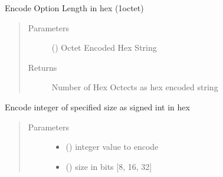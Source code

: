 \documentclass[letterpaper,10pt,english]{sphinxmanual}
\begin{document}
\begin{fulllineitems}

\begin{fulllineitems}
\label{\detokenize{dhcp_encode-class:bloxone.dhcp_encode.hex_length}}
\sphinxAtStartPar
Encode Option Length in hex (1\sphinxhyphen{}octet)
\begin{quote}\begin{description}
\item[{Parameters}] \leavevmode
\sphinxAtStartPar
{} () \textendash{} Octet Encoded Hex String

\item[{Returns}] \leavevmode
\sphinxAtStartPar
Number of Hex Octects as hex encoded string

\end{description}\end{quote}

\end{fulllineitems}


\begin{fulllineitems}
\label{\detokenize{dhcp_encode-class:bloxone.dhcp_encode.int_to_hex}}
\sphinxAtStartPar
Encode integer of specified size as signed int in hex
\begin{quote}\begin{description}
\item[{Parameters}] \leavevmode\begin{itemize}
\item {} 
\sphinxAtStartPar
{} () \textendash{} integer value to encode

\item {} 
\sphinxAtStartPar
{} () \textendash{} size in bits {[}8, 16, 32{]}

\end{itemize}


\end{description}
\end{quote}
\end{fulllineitems}
\end{fulllineitems}
\end{document}

